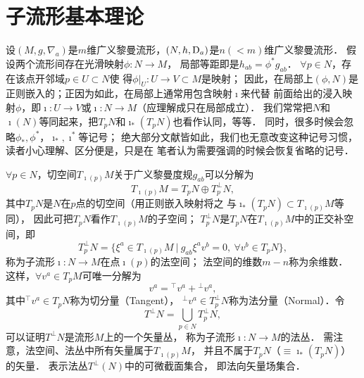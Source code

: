 \section{子流形基本理论}
设$(M,g,\nabla_a)$是$m$维广义黎曼流形，$(N,h,{\rm D}_a)$是$n(<m)$维广义黎曼流形．
假设两个流形间存在光滑映射$\phi:N \to M$，
局部等距即是$h_{ab}=\phi^* {g}_{ab}$．
$\forall p\in N$，存在该点开邻域$p \in {U}\subset N$使
得$\phi|_{U}: {U}\to {V}\subset {M}$是映射；
因此，在局部上$(\phi,N)$是正则嵌入的；正因为如此，在局部上通常用包含映射$\imath$来代替
前面给出的浸入映射$\phi$，即$\imath:{U}\to {V}$或$\imath:N \to {M}$（应理解成只在局部成立）．
我们常常把$N$和$\imath(N)$等同起来，把$T_pN$和$\imath_* (T_p N)$也看作认同，等等．
同时，很多时候会忽略$\phi_{*},\phi^{*}$，$\imath_*,\imath^*$等记号；
绝大部分文献皆如此，我们也无意改变这种记号习惯，读者小心理解、区分便是，只是在
笔者认为需要强调的时候会恢复省略的记号．


$\forall p\in N$，切空间$T_{\imath(p)} M$关于广义黎曼度规${g}_{ab}$可以分解为
\begin{equation}
    T_{\imath(p)}{M} = T_pN \oplus T_p^\bot N ,
\end{equation}
其中$T_pN$是$N$在$p$点的切空间（用正则嵌入映射将之
与$\imath_* (T_pN)\subset T_{\imath(p)}{M}$等同），
因此可把$T_pN$看作$T_{\imath(p)} M $的子空间；
$T_p^\bot N$是$T_pN$在$T_{\imath(p)}{M}$中的正交补空间，即
\begin{equation}\label{chsm:eqn_orthogonal-decomposition-TN-TbN}
    T_p^\bot N=\bigl\{ \xi^a \in T_{\imath(p)}{M}\ |\
    {g}_{ab}\xi^a v^b=0,\ \forall v^b\in T_pN \bigr\} ,
\end{equation}
称为子流形$\imath : N\to {M}$在点$\imath(p)$的{\heiti 法空间}；
法空间的维数$m-n$称为{\heiti 余维数}．
这样，$\forall v^a\in T_p{M}$可唯一分解为
\begin{equation}\label{chsm:eqn_orthogonal-decomposition}
    v^a = {}^\top v^{a} + {}^\bot v {^a} ,
\end{equation}
其中${}^\top v^{a} \in T_pN$称为切分量（Tangent），
${}^\bot v {^a} \in T_p^\bot N$称为法分量（Normal）．令
\begin{equation}
    T^\bot N = \bigcup_{p\in N} T_p^\bot N ,
\end{equation}
可以证明$T^\bot N$是流形${M}$上的一个矢量丛，
称为子流形$\imath : N\to {M}$的{\heiti 法丛}．
需注意，法空间、法丛中所有矢量属于$T_{\imath(p)}{M}$，
并且不属于$T_pN$（$\equiv\imath_*(T_pN)$）的矢量．
表示法丛$T^\bot(N)$中的可微截面集合，
即法向矢量场集合．

